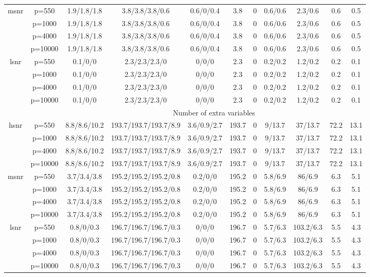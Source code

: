 \begin{table}[ht]
{\begin{tabular}{|c|c|ccccccccc|}
  \midrule\multirow{4}[2]{*}{msnr} & p=550 & 1.9/1.8/1.8 & 3.8/3.8/3.8/0.6 & 0.6/0/0.4 & 3.8 & 0 & 0.6/0.6 & 2.3/0.6 & 0.6 & 0.5 \\ 
   & p=1000 & 1.9/1.8/1.8 & 3.8/3.8/3.8/0.6 & 0.6/0/0.4 & 3.8 & 0 & 0.6/0.6 & 2.3/0.6 & 0.6 & 0.5 \\ 
   & p=4000 & 1.9/1.8/1.8 & 3.8/3.8/3.8/0.6 & 0.6/0/0.4 & 3.8 & 0 & 0.6/0.6 & 2.3/0.6 & 0.6 & 0.5 \\ 
   & p=10000 & 1.9/1.8/1.8 & 3.8/3.8/3.8/0.6 & 0.6/0/0.4 & 3.8 & 0 & 0.6/0.6 & 2.3/0.6 & 0.6 & 0.5 \\ 
  \midrule\multirow{4}[2]{*}{lsnr} & p=550 & 0.1/0/0 & 2.3/2.3/2.3/0 & 0/0/0 & 2.3 & 0 & 0.2/0.2 & 1.2/0.2 & 0.2 & 0.1 \\ 
   & p=1000 & 0.1/0/0 & 2.3/2.3/2.3/0 & 0/0/0 & 2.3 & 0 & 0.2/0.2 & 1.2/0.2 & 0.2 & 0.1 \\ 
   & p=4000 & 0.1/0/0 & 2.3/2.3/2.3/0 & 0/0/0 & 2.3 & 0 & 0.2/0.2 & 1.2/0.2 & 0.2 & 0.1 \\ 
   & p=10000 & 0.1/0/0 & 2.3/2.3/2.3/0 & 0/0/0 & 2.3 & 0 & 0.2/0.2 & 1.2/0.2 & 0.2 & 0.1 \\ 
   \midrule 
 \multicolumn{1}{|c}{} &       & \multicolumn{9}{c|}{Number of extra variables} \\
\midrule\multirow{4}[2]{*}{hsnr} & p=550 & 8.8/8.6/10.2 & 193.7/193.7/193.7/8.9 & 3.6/0.9/2.7 & 193.7 & 0 & 9/13.7 & 37/13.7 & 72.2 & 13.1 \\ 
   & p=1000 & 8.8/8.6/10.2 & 193.7/193.7/193.7/8.9 & 3.6/0.9/2.7 & 193.7 & 0 & 9/13.7 & 37/13.7 & 72.2 & 13.1 \\ 
   & p=4000 & 8.8/8.6/10.2 & 193.7/193.7/193.7/8.9 & 3.6/0.9/2.7 & 193.7 & 0 & 9/13.7 & 37/13.7 & 72.2 & 13.1 \\ 
   & p=10000 & 8.8/8.6/10.2 & 193.7/193.7/193.7/8.9 & 3.6/0.9/2.7 & 193.7 & 0 & 9/13.7 & 37/13.7 & 72.2 & 13.1 \\ 
  \midrule\multirow{4}[2]{*}{msnr} & p=550 & 3.7/3.4/3.8 & 195.2/195.2/195.2/0.8 & 0.2/0/0 & 195.2 & 0 & 5.8/6.9 & 86/6.9 & 6.3 & 5.1 \\ 
   & p=1000 & 3.7/3.4/3.8 & 195.2/195.2/195.2/0.8 & 0.2/0/0 & 195.2 & 0 & 5.8/6.9 & 86/6.9 & 6.3 & 5.1 \\ 
   & p=4000 & 3.7/3.4/3.8 & 195.2/195.2/195.2/0.8 & 0.2/0/0 & 195.2 & 0 & 5.8/6.9 & 86/6.9 & 6.3 & 5.1 \\ 
   & p=10000 & 3.7/3.4/3.8 & 195.2/195.2/195.2/0.8 & 0.2/0/0 & 195.2 & 0 & 5.8/6.9 & 86/6.9 & 6.3 & 5.1 \\ 
  \midrule\multirow{4}[2]{*}{lsnr} & p=550 & 0.8/0/0.3 & 196.7/196.7/196.7/0.3 & 0/0/0 & 196.7 & 0 & 5.7/6.3 & 103.2/6.3 & 5.5 & 4.3 \\ 
   & p=1000 & 0.8/0/0.3 & 196.7/196.7/196.7/0.3 & 0/0/0 & 196.7 & 0 & 5.7/6.3 & 103.2/6.3 & 5.5 & 4.3 \\ 
   & p=4000 & 0.8/0/0.3 & 196.7/196.7/196.7/0.3 & 0/0/0 & 196.7 & 0 & 5.7/6.3 & 103.2/6.3 & 5.5 & 4.3 \\ 
   & p=10000 & 0.8/0/0.3 & 196.7/196.7/196.7/0.3 & 0/0/0 & 196.7 & 0 & 5.7/6.3 & 103.2/6.3 & 5.5 & 4.3 \\ 
   \bottomrule 
\end{tabular}
}
\end{table}
